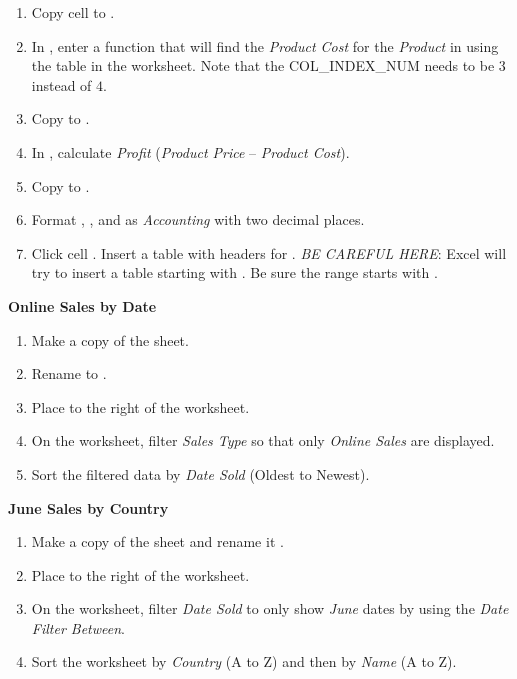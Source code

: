 \begin{enumbox}
\begin{enumerate}
		\item Copy cell  to . 
		\item In , enter a  function that will find the \textit{Product Cost} for the \textit{Product} in  using the table in the  worksheet. Note that the COL\_INDEX\_NUM needs to be $ 3 $ instead of $ 4 $. 
		\item Copy  to .
		\item In , calculate \textit{Profit} (\textit{Product Price} $ – $ \textit{Product Cost}).
		\item Copy  to .
		\item Format , , and  as \textit{Accounting} with two decimal places.
		\item Click cell . Insert a table with headers for . \textit{BE CAREFUL HERE}: Excel will try to insert a table starting with . Be sure the range starts with .
	\end{enumerate}
\end{enumbox}
	
\noindent
\textbf{Online Sales by Date}

\begin{enumbox}
	\begin{enumerate}
		\item Make a copy of the  sheet.
		\item Rename  to . \item Place  to the right of the  worksheet. 
		\item On the  worksheet, filter \textit{Sales Type} so that only \textit{Online Sales} are displayed. 
		\item Sort the filtered data by \textit{Date Sold} (Oldest to Newest).
	\end{enumerate}
\end{enumbox}
	
\noindent
\textbf{June Sales by Country}

\begin{enumbox}
	\begin{enumerate}
		\item Make a copy of the  sheet and rename it . 
		\item Place  to the right of the  worksheet. 
		\item On the  worksheet, filter \textit{Date Sold} to only show \textit{June} dates by using the \textit{Date Filter Between}. 
		\item Sort the worksheet by \textit{Country} (A to Z) and then by \textit{Name} (A to Z).
	\end{enumerate}
\end{enumbox}
	
